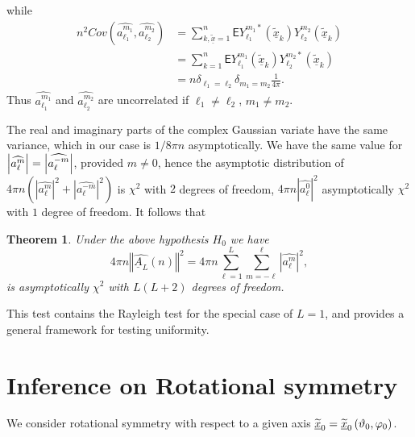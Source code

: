 \documentclass[preprint,11pt,a4paper]{elsarticle}
\newtheorem{theorem}{Theorem}
\begin{document}
while%
\begin{align*}
n^{2}Cov\left( \widehat{a_{\ell_{1}}^{m_{1}}},\widehat{a_{\ell_{2}}^{m_{2}}}%
\right) & =\sum_{k,\underline{\widetilde{x}}=1}^{n}\mathsf{E}%
Y_{\ell_{1}}^{m_{1}\ast}\left( \underline{\widetilde{x}}_{k}\right)
Y_{\ell_{2}}^{m_{2}}\left( \underline{\widetilde{x}}_{k}\right) \\
& =\sum_{k=1}^{n}\mathsf{E}Y_{\ell_{1}}^{m_{1}}\left( \underline{\widetilde{x%
}}_{k}\right) Y_{\ell_{2}}^{m_{2}\ast}\left( \underline{\widetilde{x}}%
_{k}\right) \\
& =n\delta_{\ell_{1}=\ell_{2}}\delta_{m_{1}=m_{2}}\frac{1}{4\pi}.
\end{align*}
Thus $\widehat{a_{\ell_{1}}^{m_{1}}}$ and $\widehat{a_{\ell_{2}}^{m_{2}}}$
are uncorrelated if $\ell_{1}\neq\ell_{2}$, $m_{1}\neq m_{2}$.

The real and imaginary parts of the complex Gaussian variate have the same
variance, which in our case is $1/8\pi n$ asymptotically. We have the same
value for $\left\vert \widehat{a_{\ell}^{m}}\right\vert =\left\vert \widehat{%
a_{\ell}^{-m}}\right\vert $, provided $m\neq0$, hence the asymptotic
distribution of $4\pi n\left( \left\vert \widehat{a_{\ell}^{m}}\right\vert
^{2}+\left\vert \widehat{a_{\ell}^{-m}}\right\vert ^{2}\right) $ is $\chi
^{2}$ with $2$ degrees of freedom, $4\pi n\left\vert \widehat{a_{\ell}^{0}}%
\right\vert ^{2}$ asymptotically $\chi^{2}$ with $1$ degree of freedom. It
follows that

\begin{theorem}
Under the above hypothesis $H_{0}$ we have 
\begin{equation*}
4\pi n\left\Vert \widehat{\underline{A}_{L}}\left( n\right) \right\Vert
^{2}=4\pi n\sum_{\ell=1}^{L}\sum_{m=-\ell}^{\ell}\left\vert \widehat{a_{\ell
}^{m}}\right\vert ^{2},
\end{equation*}
is asymptotically $\chi^{2}$ with $L\left( L+2\right) $ degrees of freedom.
\end{theorem}

This test contains the Rayleigh test for the special case of $L=1$, and
provides a general framework for testing uniformity.

\section{Inference on Rotational symmetry}

We consider rotational symmetry with respect to a given axis $\underline{%
\widetilde{x}}_{0}=\underline{\widetilde{x}}_{0}\left(
\vartheta_{0},\varphi_{0}\right) $.
\end{document}
